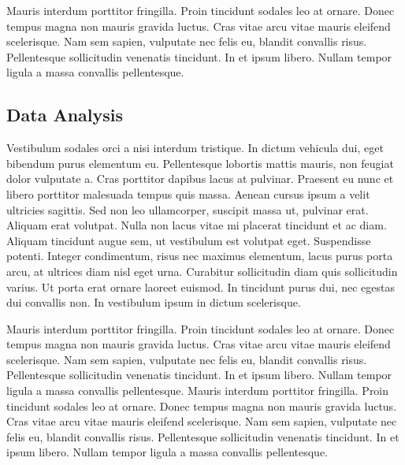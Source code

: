 Mauris interdum porttitor fringilla. Proin tincidunt sodales leo at ornare. Donec tempus
magna non mauris gravida luctus. Cras vitae arcu vitae mauris eleifend scelerisque. Nam
sem sapien, vulputate nec felis eu, blandit convallis risus. Pellentesque sollicitudin
venenatis tincidunt. In et ipsum libero. Nullam tempor ligula a massa convallis pellentesque.

\subsection{Data Analysis}

Vestibulum sodales orci a nisi interdum tristique. In dictum vehicula dui, eget bibendum
purus elementum eu. Pellentesque lobortis mattis mauris, non feugiat dolor vulputate a.
Cras porttitor dapibus lacus at pulvinar. Praesent eu nunc et libero porttitor malesuada
tempus quis massa. Aenean cursus ipsum a velit ultricies sagittis. Sed non leo
ullamcorper, suscipit massa ut, pulvinar erat. Aliquam erat volutpat. Nulla non lacus
vitae mi placerat tincidunt et ac diam. Aliquam tincidunt augue sem, ut vestibulum est
volutpat eget. Suspendisse potenti. Integer condimentum, risus nec maximus elementum,
lacus purus porta arcu, at ultrices diam nisl eget urna. Curabitur sollicitudin diam quis
sollicitudin varius. Ut porta erat ornare laoreet euismod. In tincidunt purus dui, nec
egestas dui convallis non. In vestibulum ipsum in dictum scelerisque.

Mauris interdum porttitor fringilla. Proin tincidunt sodales leo at ornare. Donec tempus
magna non mauris gravida luctus. Cras vitae arcu vitae mauris eleifend scelerisque. Nam
sem sapien, vulputate nec felis eu, blandit convallis risus. Pellentesque sollicitudin
venenatis tincidunt. In et ipsum libero. Nullam tempor ligula a massa convallis
pellentesque. Mauris interdum porttitor fringilla. Proin tincidunt sodales leo at ornare.
Donec tempus magna non mauris gravida luctus. Cras vitae arcu vitae mauris eleifend
scelerisque. Nam sem sapien, vulputate nec felis eu, blandit convallis risus.
Pellentesque sollicitudin venenatis tincidunt. In et ipsum libero. Nullam tempor ligula a
massa convallis pellentesque.
